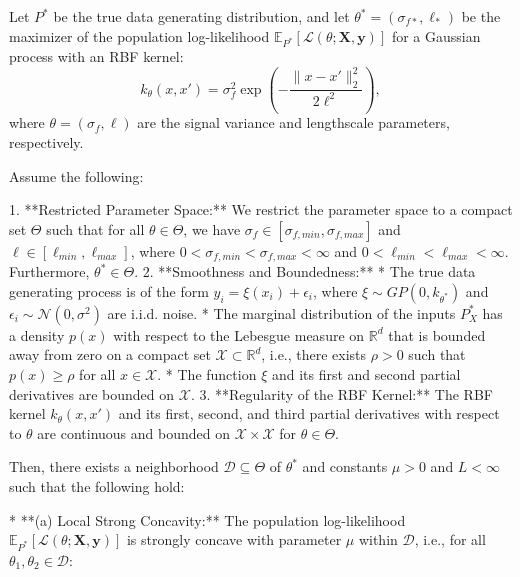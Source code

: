 

\begin{theorem}\label{thm:local-strong-concavity-restricted}
Let $P^*$ be the true data generating distribution, and let $\theta^* = (\sigma_{f*}, \ell_*)$ be the maximizer of the population log-likelihood $\mathbb{E}_{P^*}[\mathcal{L}(\theta; \mathbf{X}, \mathbf{y})]$ for a Gaussian process with an RBF kernel:
$$
k_\theta(x, x') = \sigma_f^2 \exp\left(-\frac{\|x - x'\|_2^2}{2\ell^2}\right),
$$
where $\theta = (\sigma_f, \ell)$ are the signal variance and lengthscale parameters, respectively.

Assume the following:

1.  **Restricted Parameter Space:** We restrict the parameter space to a compact set $\Theta$ such that for all $\theta \in \Theta$, we have $\sigma_f \in [\sigma_{f, min}, \sigma_{f, max}]$ and $\ell \in [\ell_{min}, \ell_{max}]$, where $0 < \sigma_{f, min} < \sigma_{f, max} < \infty$ and $0 < \ell_{min} < \ell_{max} < \infty$. Furthermore, $\theta^* \in \Theta$.
2.  **Smoothness and Boundedness:**
    *   The true data generating process is of the form $y_i = \xi(x_i) + \epsilon_i$, where $\xi \sim GP(0, k_{\theta^*})$ and $\epsilon_i \sim \mathcal{N}(0, \sigma^2)$ are i.i.d. noise.
    *   The marginal distribution of the inputs $P^*_X$ has a density $p(x)$ with respect to the Lebesgue measure on $\mathbb{R}^d$ that is bounded away from zero on a compact set $\mathcal{X} \subset \mathbb{R}^d$, i.e., there exists $\rho > 0$ such that $p(x) \geq \rho$ for all $x \in \mathcal{X}$.
    *   The function $\xi$ and its first and second partial derivatives are bounded on $\mathcal{X}$.
3.  **Regularity of the RBF Kernel:** The RBF kernel $k_\theta(x,x')$ and its first, second, and third partial derivatives with respect to $\theta$ are continuous and bounded on $\mathcal{X} \times \mathcal{X}$ for $\theta \in \Theta$.

Then, there exists a neighborhood $\mathcal{D} \subseteq \Theta$ of $\theta^*$ and constants $\mu > 0$ and $L < \infty$ such that the following hold:

*   **(a) Local Strong Concavity:** The population log-likelihood $\mathbb{E}_{P^*}[\mathcal{L}(\theta; \mathbf{X}, \mathbf{y})]$ is strongly concave with parameter $\mu$ within $\mathcal{D}$, i.e., for all $\theta_1, \theta_2 \in \mathcal{D}$:


\end{theorem}
